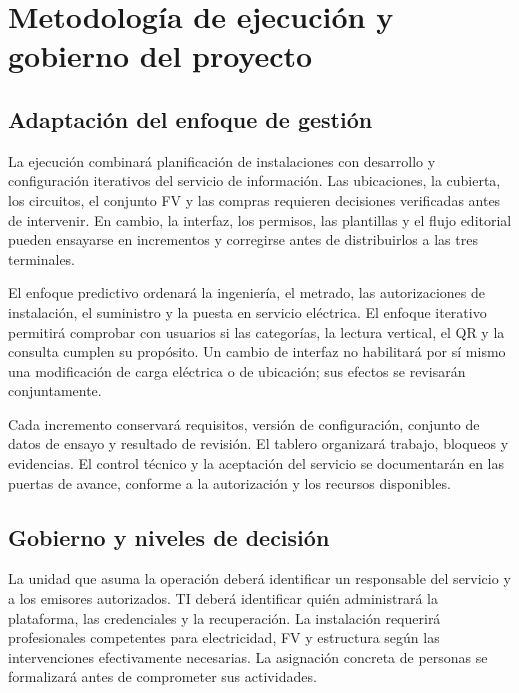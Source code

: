 \section{Metodología de ejecución y gobierno del proyecto}
\label{sec:int_metodologia}
\subsection{Adaptación del enfoque de gestión}
La ejecución combinará planificación de instalaciones con desarrollo y configuración iterativos del servicio de información. Las ubicaciones, la cubierta, los circuitos, el conjunto FV y las compras requieren decisiones verificadas antes de intervenir. En cambio, la interfaz, los permisos, las plantillas y el flujo editorial pueden ensayarse en incrementos y corregirse antes de distribuirlos a las tres terminales.

El enfoque predictivo ordenará la ingeniería, el metrado, las autorizaciones de instalación, el suministro y la puesta en servicio eléctrica. El enfoque iterativo permitirá comprobar con usuarios si las categorías, la lectura vertical, el QR y la consulta cumplen su propósito. Un cambio de interfaz no habilitará por sí mismo una modificación de carga eléctrica o de ubicación; sus efectos se revisarán conjuntamente.


Cada incremento conservará requisitos, versión de configuración, conjunto de datos de ensayo y resultado de revisión. El tablero organizará trabajo, bloqueos y evidencias. El control técnico y la aceptación del servicio se documentarán en las puertas de avance, conforme a la autorización y los recursos disponibles.

\subsection{Gobierno y niveles de decisión}
La unidad que asuma la operación deberá identificar un responsable del servicio y a los emisores autorizados. TI deberá identificar quién administrará la plataforma, las credenciales y la recuperación. La instalación requerirá profesionales competentes para electricidad, FV y estructura según las intervenciones efectivamente necesarias. La asignación concreta de personas se formalizará antes de comprometer sus actividades.

